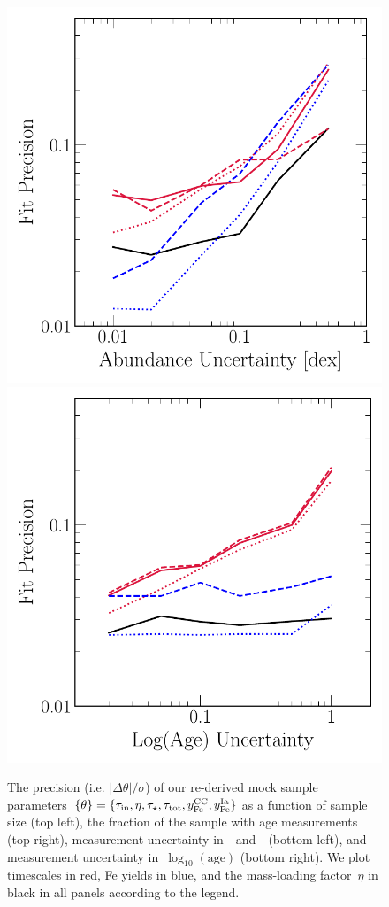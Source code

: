 \documentclass[ms.tex]{subfiles}
\begin{document}
\begin{figure}
\includegraphics[scale = 0.55]{precision_abundanceuncertainty.pdf}
\includegraphics[scale = 0.55]{precision_ageuncertainty.pdf}
\caption{
The precision (i.e. $\left|\Delta \theta\right| / \sigma$) of our re-derived
mock sample parameters~$\{\theta\} = \{\tau_\text{in}, \eta, \tau_\star,
\tau_\text{tot}, y_\text{Fe}^\text{CC}, y_\text{Fe}^\text{Ia}\}$ as a function of sample size (top left),
the fraction of the sample with age measurements (top right), measurement
uncertainty in~\feh~and~\afe~(bottom left), and measurement uncertainty
in~$\log_{10}(\text{age})$ (bottom right).
We plot timescales in red, Fe yields in blue, and the mass-loading
factor~$\eta$ in black in all panels according to the legend.
}
\label{fig:precision}
\end{figure}
\end{document}
